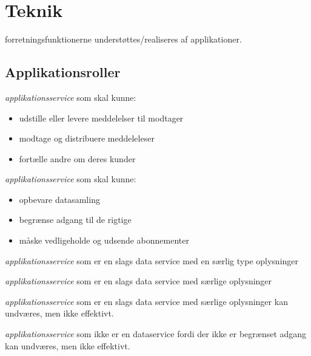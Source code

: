 \section{Teknik}\label{teknik}

forretningsfunktionerne understøttes/realiseres af applikationer.

\subsection{Applikationsroller}\label{applikationsroller}

\begin{description}
\tightlist
\item[eDelivery Service Provider]
\emph{applikationsservice} som skal kunne:
\end{description}

\begin{itemize}
\tightlist
\item
  udstille eller levere meddelelser til modtager
\item
  modtage og distribuere meddeleleser
\item
  fortælle andre om deres kunder
\end{itemize}

\begin{description}
\tightlist
\item[Dataservice]
\emph{applikationsservice} som skal kunne:
\end{description}

\begin{itemize}
\tightlist
\item
  opbevare datasamling
\item
  begrænse adgang til de rigtige
\item
  måske vedligeholde og udsende abonnementer
\end{itemize}

\begin{description}
\tightlist
\item[Kontaktregister]
\emph{applikationsservice} som er en slags data service med en særlig
type oplysninger
\item[Log]
\emph{applikationsservice} som er en slags data service med særlige
oplysninger
\item[Indeks]
\emph{applikationsservice} som er en slags data service med særlige
oplysninger kan undværes, men ikke effektivt.
\item[Katalog]
\emph{applikationsservice} som ikke er en dataservice fordi der ikke er
begrænset adgang kan undværes, men ikke effektivt.
\end{description}


